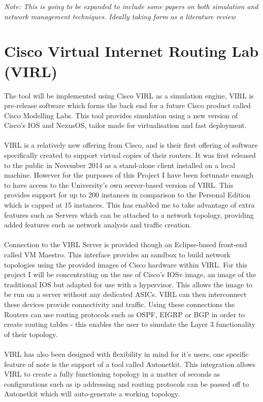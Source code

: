 \documentclass[11pt]{report}
\begin{document}
\textit{Note: This is going to be expanded to include some papers on both simulation and network management techniques. Ideally taking form as a literature review}

\section{Cisco Virtual Internet Routing Lab (VIRL)}

The tool will be implemented using Cisco VIRL as a simulation engine, VIRL is pre-release software which forms the back end for a future Cisco product called Cisco Modelling Labs. This tool provides simulation using a new version of Cisco’s IOS and NexusOS, tailor made for virtualisation and fast deployment.
\\
\\
VIRL is a relatively new offering from Cisco, and is their first offering of software specifically created to support virtual copies of their routers. It was first released to the public in November 2014 as a stand-alone client installed on a local machine. However for the purposes of this Project I have been fortunate enough to have access to the University's own server-based version of VIRL. This provides support for up to 200 instances in comparison to the Personal Edition which is capped at 15 instances. This has enabled me to take advantage of extra features such as Servers which can be attached to a network topology, providing added features such as network analysis and traffic creation.
\\
\\
Connection to the VIRL Server is provided though an Eclipse-based front-end called VM Maestro. This interface provides an sandbox to build network topologies using the provided images of Cisco hardware within VIRL. For this project I will be concentrating on the use of Cisco's IOSv image, an image of the traditional IOS but adapted for use with a hypervisor. This allows the image to be run on a server without any dedicated ASICs. VIRL can then interconnect these devices provide connectivity and traffic. Using these connections the Routers can use routing protocols such as OSPF, EIGRP or BGP in order to create routing tables - this enables the user to simulate the Layer 3 functionality of their topology.
\\
\\
VIRL has also been designed with flexibility in mind for it's users, one specific feature of note is the support of a tool called Autonetkit. This integration allows VIRL to create a fully functioning topology in a matter of seconds as configurations such as ip addressing and routing protocols can be passed off to Autonetkit which will auto-generate a working topology.
\end{document}
